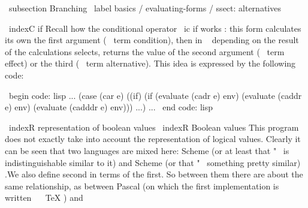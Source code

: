 \ subsection {Branching} \ label {basics / evaluating-forms / ssect: alternatives}

\ indexC {if}
Recall how the conditional operator \ ic {if} works : this form calculates its own
the first argument ( \ term {condition}), then in ~ depending on the result of the calculations
selects, returns the value of the second argument ( \ term {effect}) or the third
( \ term {alternative}). This idea is expressed by the following code:

\ begin {code: lisp}
... (case (car e)
      ((if) (if (evaluate (cadr e) env)
                (evaluate (caddr e) env)
                (evaluate (cadddr e) env))) ...) ...
\ end {code: lisp}

\ indexR {representation of boolean values}
\ indexR {Boolean values}
This program does not exactly take into account the representation of logical values. Clearly
it can be seen that two languages ​​are mixed here: Scheme (or at least that "~ is indistinguishable
similar to it) and Scheme (or that "~ something pretty similar) .We also define
second in terms of the first. So between them there are about the same
relationship, as between Pascal (on which the first implementation is written ~ \ TeX ) and
